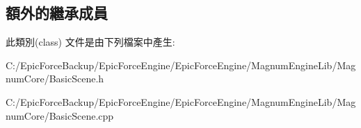 \subsection*{額外的繼承成員}


此類別(class) 文件是由下列檔案中產生\+:\begin{DoxyCompactItemize}
\item 
C\+:/\+Epic\+Force\+Backup/\+Epic\+Force\+Engine/\+Epic\+Force\+Engine/\+Magnum\+Engine\+Lib/\+Magnum\+Core/Basic\+Scene.\+h\item 
C\+:/\+Epic\+Force\+Backup/\+Epic\+Force\+Engine/\+Epic\+Force\+Engine/\+Magnum\+Engine\+Lib/\+Magnum\+Core/Basic\+Scene.\+cpp\end{DoxyCompactItemize}
